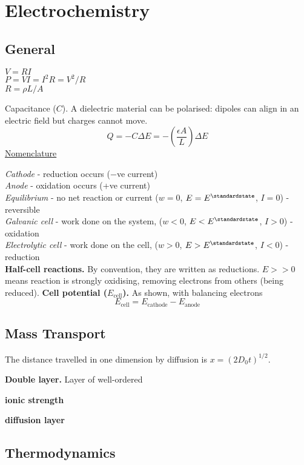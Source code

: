 \pagebreak

\section{Electrochemistry}

\subsection*{General}
$V = RI$ \\
$P = VI = I^2R = V^2/R$ \\
$R = \rho L / A$

Capacitance ($C$). A dielectric material can be polarised: dipoles can align in an electric field
but charges cannot move.
$$Q = -C \Delta E = -\left(\frac{\epsilon A}{L}\right) \Delta E$$\underline{Nomenclature}

\textit{Cathode} - reduction occurs ($-$ve current)\\
\textit{Anode} - oxidation occurs  (+ve current)\\
\textit{Equilibrium} - no net reaction or current ($w = 0$, $E = E^\standardstate$, $I = 0$) - reversible\\
\textit{Galvanic cell} - work done on the system, ($w < 0$, $E < E^\standardstate$, $I > 0$) - oxidation\\
\textit{Electrolytic cell} - work done on the cell, ($w > 0$, $E > E^\standardstate$, $I < 0$) - reduction\\
\textbf{Half-cell reactions.} By convention, they are written as reductions. $ E >> 0$
means reaction is strongly oxidising, removing electrons from others (being reduced).
\textbf{Cell potential ($E_{\mathrm{cell}}$).} As shown, with balancing electrons
\begin{equation*}
    E_{\mathrm{cell}} = E_{\mathrm{cathode}} - E_{\mathrm{anode}}
\end{equation*}
\subsection*{Mass Transport}

The distance travelled in one dimension by diffusion is $x = (2D_0t)^{1/2}$.

\textbf{Double layer.} Layer of well-ordered

\textbf{ionic strength}

\textbf{diffusion layer}

\subsection*{Thermodynamics}

